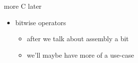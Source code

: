 
\begin{frame}{more C later}
\begin{itemize}
\item bitwise operators
    \begin{itemize}
    \item after we talk about assembly a bit
    \item we'll maybe have more of a use-case
    \end{itemize}
\end{itemize}
\end{frame}


